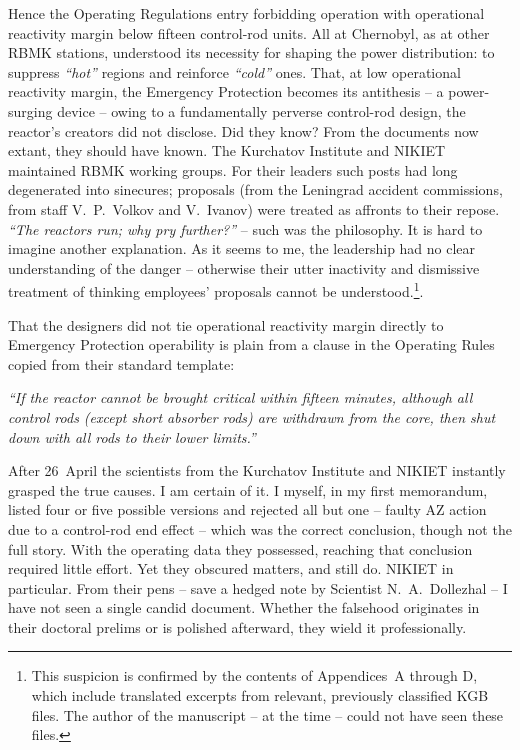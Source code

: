 \documentclass[openright]{bookest}
\begin{document}
Hence the Operating Regulations entry forbidding operation with operational reactivity margin below fifteen control-rod units. All at Chernobyl, as at other RBMK stations, understood its necessity for shaping the power distribution: to suppress \textit{``hot''} regions and reinforce \textit{``cold''} ones. That, at low operational reactivity margin, the Emergency Protection becomes its antithesis -- a power-surging device -- owing to a fundamentally perverse control-rod design, the reactor's creators did not disclose. Did they know? From the documents now extant, they should have known. The Kurchatov Institute and NIKIET maintained RBMK working groups. For their leaders such posts had long degenerated into sinecures; proposals (from the Leningrad accident commissions, from staff V.~P.~Volkov and V.~Ivanov) were treated as affronts to their repose. \textit{``The reactors run; why pry further?''} -- such was the philosophy. It is hard to imagine another explanation. As it seems to me, the leadership had no clear understanding of the danger -- otherwise their utter inactivity and dismissive treatment of thinking employees' proposals cannot be understood.\footnote{This suspicion is confirmed by the contents of Appendices~A through D, which include translated excerpts from relevant, previously classified KGB files. The author of the manuscript -- at the time -- could not have seen these files.}.

That the designers did not tie operational reactivity margin directly to Emergency Protection operability is plain from a clause in the Operating Rules copied from their standard template:

\begin{personal}
\textit{``If the reactor cannot be brought critical within fifteen minutes, although all control rods (except short absorber rods) are withdrawn from the core, then shut down with all rods to their lower limits.''}
\end{personal}

After 26~April the scientists from the Kurchatov Institute and NIKIET instantly grasped the true causes. I am certain of it. I myself, in my first memorandum, listed four or five possible versions and rejected all but one -- faulty AZ action due to a control-rod end effect -- which was the correct conclusion, though not the full story. With the operating data they possessed, reaching that conclusion required little effort. Yet they obscured matters, and still do. NIKIET in particular. From their pens -- save a hedged note by Scientist N.~A.~Dollezhal -- I have not seen a single candid document. Whether the falsehood originates in their doctoral prelims or is polished afterward, they wield it professionally.
\end{document}
